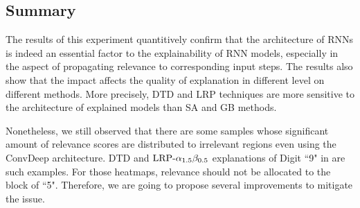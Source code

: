 \subsection{Summary}
The results of this experiment quantitively confirm that the architecture of RNNs is indeed an essential factor to the explainability of RNN models, especially in the aspect of propagating relevance to corresponding input steps.  The results also show that the impact affects the quality of explanation in different level on different methods. More precisely, DTD and LRP techniques are more sensitive to the architecture of explained models than SA and GB methods.

Nonetheless, we  still observed that there are some samples whose significant amount of relevance scores are distributed to irrelevant regions even using the ConvDeep architecture. DTD and $\text{LRP-}\alpha_{1.5}\beta_{0.5}$ explanations of Digit ``9" in \addfigure{\ref{fig:heatmap_msc_mix_for_thesis}} are such examples. For those heatmaps, relevance should not be allocated to the block of ``5".   Therefore, we are going to propose several improvements to mitigate the issue.

